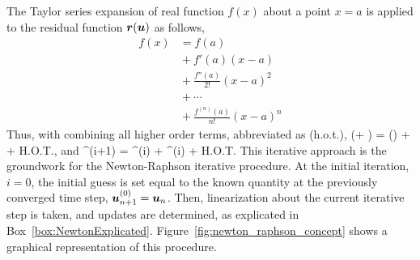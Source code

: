 The Taylor series expansion of real function $f(x)$ 
about a point $x=a$ is applied to 
the residual function $\mbox{\boldmath $r$}(\mbox{\boldmath $u$})$ as follows,
\begin{align}
 f(x) & = f(a) \nonumber \\
      & \hspace{0cm} + f'(a) (x-a) \nonumber \\
      & \hspace{0cm} + \frac{f''(a)}{2!} (x-a)^2 \nonumber \\
      & \hspace{0cm} + \cdots \nonumber \\
      & \hspace{0cm} + \frac{f^{(n)}(a)}{n!} (x-a)^n 
\end{align}
Thus, with combining all higher order terms, abbreviated as ({\sc h.o.t.}),
\be
 \vr(\vu + \Delta \vu) 
 = \vr(\vu) 
 + \frac{\partial \vr(\vu)}{\partial \vu} \Delta \vu 
 + \mbox{\footnotesize H.O.T.},
\ee
and
\be
 \vr^{(i+1)} = \vr^{(i)} 
 +  \Delta \vu^{(i)} 
 + \mbox{\footnotesize H.O.T.}
\ee
This iterative approach is the groundwork for the Newton-Raphson 
iterative procedure.  At the 
initial iteration, $i=0$, the 
initial guess is set equal to the known quantity 
at the previously converged time step, 
$\mbox{\boldmath $u$}_{n+1}^{(0)} = \mbox{\boldmath $u$}_{n}$.  Then, 
linearization about the current iterative step is taken, and 
updates are determined, as explicated in Box~\ref{box:NewtonExplicated}.
Figure~\ref{fig:newton_raphson_concept} 
shows a graphical representation of this procedure.

